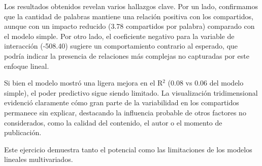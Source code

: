 \documentclass[12pt, a4paper]{article}
\begin{document}
Los resultados obtenidos revelan varios hallazgos clave. Por un lado, confirmamos que la cantidad de palabras mantiene una relación positiva con los compartidos, aunque con un impacto reducido (3.78 compartidos por palabra) comparado con el modelo simple. Por otro lado, el coeficiente negativo para la variable de interacción (-508.40) sugiere un comportamiento contrario al esperado, que podría indicar la presencia de relaciones más complejas no capturadas por este enfoque lineal.

Si bien el modelo mostró una ligera mejora en el R$^2$ (0.08 vs 0.06 del modelo simple), el poder predictivo sigue siendo limitado. La visualización tridimensional evidenció claramente cómo gran parte de la variabilidad en los compartidos permanece sin explicar, destacando la influencia probable de otros factores no considerados, como la calidad del contenido, el autor o el momento de publicación.

Este ejercicio demuestra tanto el potencial como las limitaciones de los modelos lineales multivariados.
\end{document}
